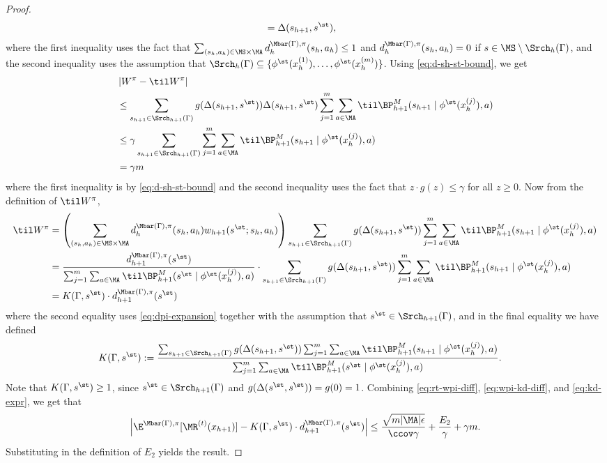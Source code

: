 \begin{proof}
\begin{align}
&= \Delta(s_{h+1},s^\st),\label{eq:d-sh-st-bound}
\end{align}
where the first inequality uses the fact that $\sum_{(s_h,a_h)\in\MS\times\MA} d^{\Mbar(\Gamma),\pi}_h(s_h,a_h) \leq 1$ and $d^{\Mbar(\Gamma),\pi}_h(s_h,a_h) = 0$ if $s \in \MS \setminus \Srch_h(\Gamma)$, and the second inequality uses the assumption that $\Srch_h(\Gamma) \subseteq \{\phi^\st(x_h^{(1)}),\dots,\phi^\st(x_h^{(m)})\}$. Using \cref{eq:d-sh-st-bound}, we get
\begin{align}
& \left|W^\pi - \til W^\pi \right| \nonumber\\ 
&\leq \sum_{s_{h+1}\in\Srch_{h+1}(\Gamma)} g(\Delta(s_{h+1},s^\st))\Delta(s_{h+1},s^\st) \sum_{j=1}^m \sum_{a\in\MA} \til\BP^M_{h+1}(s_{h+1}\mid{}\phi^\st(x_h^{(j)}),a) \nonumber\\ 
&\leq \gamma \sum_{s_{h+1}\in\Srch_{h+1}(\Gamma)} \sum_{j=1}^m \sum_{a\in\MA}\til\BP^M_{h+1}(s_{h+1}\mid{}\phi^\st(x_h^{(j)}),a) \nonumber \\ 
&= \gamma m \label{eq:wpi-kd-diff}
\end{align}
where the first inequality is by \cref{eq:d-sh-st-bound} and the second inequality uses the fact that $z\cdot g(z) \leq \gamma$ for all $z \geq 0$. Now from the definition of $\til W^\pi$,
\begin{align}
\til W^\pi 
&= \left(\sum_{(s_h,a_h)\in\MS\times\MA} d^{\Mbar(\Gamma),\pi}_h(s_h,a_h)w_{h+1}(s^\st;s_h,a_h)\right) \sum_{s_{h+1} \in \Srch_{h+1}(\Gamma)} g(\Delta(s_{h+1},s^\st))\sum_{j=1}^m \sum_{a\in\MA} \til\BP^M_{h+1}(s_{h+1}\mid{}\phi^\st(x_h^{(j)}),a) \nonumber\\ 
&= \frac{d^{\Mbar(\Gamma),\pi}_{h+1}(s^\st)}{\sum_{j=1}^m \sum_{a\in\MA}\til\BP^M_{h+1}(s^\st\mid{}\phi^\st(x_h^{(j)}),a)} \cdot \sum_{s_{h+1}\in\Srch_{h+1}(\Gamma)}g(\Delta(s_{h+1},s^\st))\sum_{j=1}^m \sum_{a\in\MA} \til\BP^M_{h+1}(s_{h+1}\mid{}\phi^\st(x_h^{(j)}),a)  \nonumber \\ 
&= K(\Gamma,s^\st) \cdot d^{\Mbar(\Gamma),\pi}_{h+1}(s^\st) \label{eq:kd-expr}
\end{align}
where the second equality uses \cref{eq:dpi-expansion} together with the assumption that $s^\st \in \Srch_{h+1}(\Gamma)$, and in the final equality we have defined
\begin{align*}
K(\Gamma,s^\st)
&:= \frac{\sum_{s_{h+1}\in\Srch_{h+1}(\Gamma)}g(\Delta(s_{h+1},s^\st))\sum_{j=1}^m \sum_{a\in\MA} \til\BP^M_{h+1}(s_{h+1}\mid{}\phi^\st(x_h^{(j)}),a)}{\sum_{j=1}^m \sum_{a\in\MA}\til\BP^M_{h+1}(s^\st\mid{}\phi^\st(x_h^{(j)}),a)}.
\end{align*}
Note that $K(\Gamma,s^\st) \geq 1$, since $s^\st \in \Srch_{h+1}(\Gamma)$ and $g(\Delta(s^\st,s^\st)) = g(0) = 1$. Combining \cref{eq:rt-wpi-diff}, \cref{eq:wpi-kd-diff}, and \cref{eq:kd-expr}, we get that
\[\left|\E^{\Mbar(\Gamma),\pi}[\MR^{(t)}(x_{h+1})] - K(\Gamma,s^\st) \cdot d^{\Mbar(\Gamma),\pi}_{h+1}(s^\st)\right| \leq \frac{\sqrt{m|\MA|\epsilon}}{\ccov \gamma} + \frac{E_2}{\gamma} + \gamma m.\]
Substituting in the definition of $E_2$ yields the result.
\end{proof}





